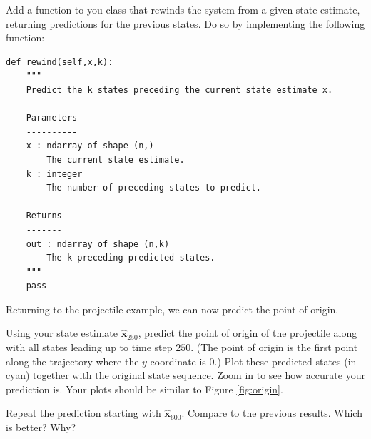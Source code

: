 \begin{problem}
Add a function to you class that rewinds the system from a given state estimate, returning predictions for the previous states.
Do so by implementing the following function:
\begin{lstlisting}
def rewind(self,x,k):
    """
    Predict the k states preceding the current state estimate x.

    Parameters
    ----------
    x : ndarray of shape (n,)
        The current state estimate.
    k : integer
        The number of preceding states to predict.

    Returns
    -------
    out : ndarray of shape (n,k)
        The k preceding predicted states.
    """
    pass
\end{lstlisting}
\end{problem}

Returning to the projectile example, we can now predict the point of origin.

\begin{problem}
Using your state estimate $\widehat{\mathbf{x}}_{250}$, predict the point of origin of the projectile along with
all states leading up to time step $250$.
(The point of origin is the first point along the trajectory where the $y$ coordinate is $0$.)
Plot these predicted states (in cyan) together with the original state sequence.
Zoom in to see how accurate your prediction is.
Your plots should be similar to Figure \ref{fig:origin}.
\label{prob:origin_pt}

Repeat the prediction starting with $\widehat{\mathbf{x}}_{600}$.  Compare to the previous results.  Which is better?  Why?
\end{problem}
